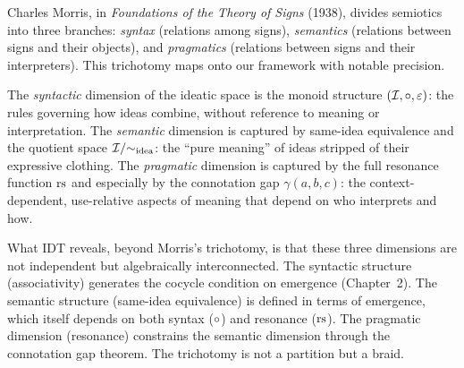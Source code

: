\begin{interpretation}\label{interp:ch6:morris_trichotomy}
Charles Morris, in \emph{Foundations of the Theory of Signs} (1938),
divides semiotics into three branches: \emph{syntax} (relations among
signs), \emph{semantics} (relations between signs and their objects), and
\emph{pragmatics} (relations between signs and their interpreters). This
trichotomy maps onto our framework with notable precision.

The \emph{syntactic} dimension of the ideatic space is the monoid structure
$(\mathcal{I}, \circ, \varepsilon)$: the rules governing how ideas combine, without
reference to meaning or interpretation. The \emph{semantic} dimension is
captured by same-idea equivalence and the quotient space $\mathcal{I} /
{\sim_{\text{idea}}}$: the ``pure meaning'' of ideas stripped of their
expressive clothing. The \emph{pragmatic} dimension is captured by the
full resonance function $\mathrm{rs}$ and especially by the connotation gap
$\gamma(a, b, c)$: the context-dependent, use-relative aspects of meaning
that depend on who interprets and how.

What IDT reveals, beyond Morris's trichotomy, is that these three
dimensions are not independent but algebraically interconnected. The
syntactic structure (associativity) generates the cocycle condition on
emergence (Chapter~2). The semantic structure (same-idea equivalence)
is defined in terms of emergence, which itself depends on both syntax
($\circ$) and resonance ($\mathrm{rs}$). The pragmatic dimension (resonance)
constrains the semantic dimension through the connotation gap theorem.
The trichotomy is not a partition but a braid.
\end{interpretation}

